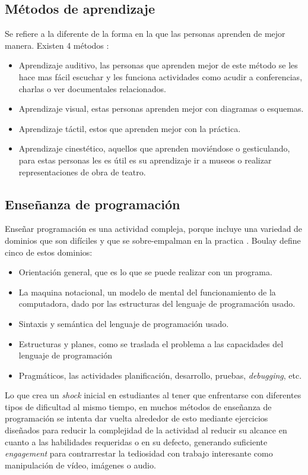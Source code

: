 \subsection{Métodos de aprendizaje}
Se refiere a la diferente de la forma en la que las personas aprenden de mejor manera. Existen 4 métodos \cite{metodos_aprendizaje}: 
\begin{itemize}
    \item Aprendizaje auditivo, las personas que aprenden mejor de este método se les hace mas fácil escuchar y les funciona actividades como acudir a conferencias, charlas o ver documentales relacionados.
    \item Aprendizaje visual, estas personas aprenden mejor con diagramas o esquemas.
    \item Aprendizaje táctil, estos que aprenden mejor con la práctica.
    \item Aprendizaje cinestético, aquellos que aprenden moviéndose o gesticulando, para estas personas les es útil es su aprendizaje ir a museos o realizar representaciones de obra de teatro.
\end{itemize}

\subsection{Enseñanza de programación}
Enseñar programación es una actividad compleja, porque incluye una variedad de dominios que son difíciles y que se sobre-empalman en la practica \cite{Robins2003}. Boulay define cinco de estos dominios:
\begin{itemize}
    \item Orientación general, que es lo que se puede realizar con un programa.
    \item La maquina notacional, un modelo de mental del funcionamiento de la computadora, dado por las estructuras del lenguaje de programación usado.
    \item Sintaxis y semántica del lenguaje de programación usado.
    \item Estructuras y planes, como se traslada el problema a las capacidades del lenguaje de programación
    \item Pragmáticos, las actividades planificación, desarrollo, pruebas, \textit{debugging}, etc. 
\end{itemize}
Lo que crea un \textit{shock} inicial en estudiantes al tener que enfrentarse con diferentes tipos de dificultad al mismo tiempo, en muchos métodos de enseñanza de programación se intenta dar vuelta alrededor de esto mediante ejercicios diseñados para reducir la complejidad de la actividad al reducir su alcance en cuanto a las habilidades requeridas o en su defecto, generando suficiente \textit{engagement} para contrarrestar la tediosidad con trabajo interesante como manipulación de vídeo, imágenes o audio.

